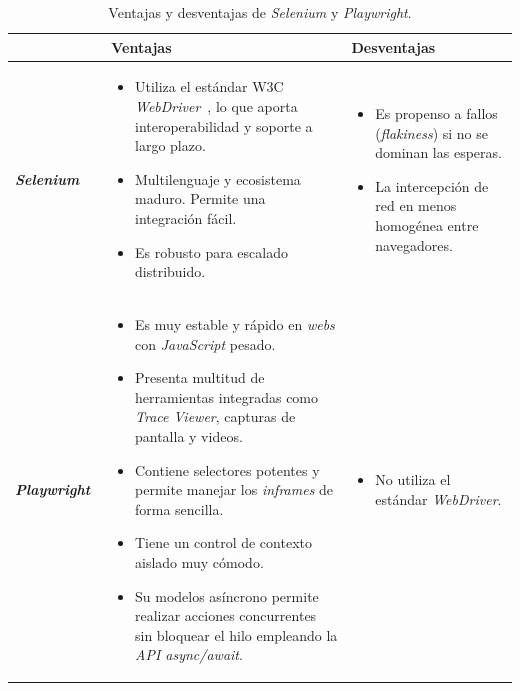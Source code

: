 \begin{table}[p]
	\centering
	\begin{tabularx}{\linewidth}{p{} p{} p{}}
		\toprule
			& \textbf{Ventajas} & \textbf{Desventajas} \\
		\midrule
		\textbf{\textit{Selenium}}~\cite{selenium:docs} & 
		
			\begin{itemize}
			\tightlist
				\item Utiliza el estándar W3C \textit{WebDriver}~\cite{w3c:webdriver2}, lo que aporta interoperabilidad y soporte a largo plazo.
				\item Multilenguaje y ecosistema maduro. Permite una integración fácil.
				\item Es robusto para escalado distribuido. 
			\end{itemize}  
			& 			
			 \begin{itemize}
			\tightlist
				\item Es propenso a fallos (\textit{flakiness}) si no se dominan las esperas.
				\item La intercepción de red en menos homogénea entre navegadores.
			\end{itemize}
			
			\\
			
		\midrule
		\textbf{\textit{Playwright}}~\cite{playwright:actionability} & 
		 
		 \begin{itemize}
			\tightlist
				\item Es muy estable y rápido en \textit{webs} con \textit{JavaScript} pesado.
				\item Presenta multitud de herramientas integradas como \textit{Trace Viewer}, capturas de pantalla y videos.
				\item Contiene selectores potentes y permite manejar los \textit{inframes} de forma sencilla. 
				\item Tiene un control de contexto aislado muy cómodo.
				\item Su modelos asíncrono permite realizar acciones concurrentes sin bloquear el hilo empleando la \textit{API async/await}.
			\end{itemize}   
			& 			
			\begin{itemize}
			\tightlist
				\item No utiliza el estándar \textit{WebDriver}. 
			\end{itemize}   
			
			\\
		
		\bottomrule
	\end{tabularx}
	\caption{Ventajas y desventajas de \textit{Selenium} y \textit{Playwright}.}
	\label{tabla:SeleniumPlaywright}
\end{table}

